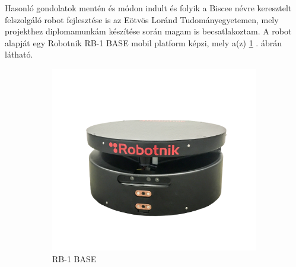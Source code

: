 Hasonló gondolatok mentén és módon indult és folyik a Biscee névre keresztelt felszolgáló robot fejlesztése is az Eötvös Loránd Tudományegyetemen, mely projekthez diplomamunkám készítése során magam is becsatlakoztam. A robot alapját egy Robotnik\cite{noauthor_autonomous_nodate} RB-1 BASE mobil platform képzi, mely a(z)
\ref{fig:rb1_base}
. ábrán látható.
\begin{figure}
    \centering
    \begin{subfigure}[b]{0.25\linewidth}
        \includegraphics[width=\linewidth]{figures/Robotnik_RB-1-BASE-frontal.png}
        \caption{RB-1 BASE}
        \label{fig:rb1_base}
    \end{subfigure}
    \begin{subfigure}[b]{0.25\linewidth}

\end{subfigure}
\end{figure}
